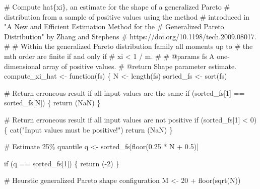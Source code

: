 \documentclass[
  letterpaper,
  DIV=11,
  numbers=noendperiod]{scrartcl}
\newenvironment{Shaded}{\begin{snugshade}}{\end{snugshade}}
\newcommand{\CommentTok}[1]{\textcolor[rgb]{0.37,0.37,0.37}{#1}}
\newcommand{\ConstantTok}[1]{\textcolor[rgb]{0.56,0.35,0.01}{#1}}
\newcommand{\ControlFlowTok}[1]{\textcolor[rgb]{0.00,0.23,0.31}{#1}}
\newcommand{\DecValTok}[1]{\textcolor[rgb]{0.68,0.00,0.00}{#1}}
\newcommand{\FloatTok}[1]{\textcolor[rgb]{0.68,0.00,0.00}{#1}}
\newcommand{\FunctionTok}[1]{\textcolor[rgb]{0.28,0.35,0.67}{#1}}
\newcommand{\NormalTok}[1]{\textcolor[rgb]{0.00,0.23,0.31}{#1}}
\newcommand{\OtherTok}[1]{\textcolor[rgb]{0.00,0.23,0.31}{#1}}
\newcommand{\SpecialCharTok}[1]{\textcolor[rgb]{0.37,0.37,0.37}{#1}}
\newcommand{\StringTok}[1]{\textcolor[rgb]{0.13,0.47,0.30}{#1}}
\begin{document}
\begin{Shaded}
\begin{Highlighting}[]
\CommentTok{\# Compute hat\{xi\}, an estimate for the shape of a generalized Pareto }
\CommentTok{\# distribution from a sample of positive values using the method }
\CommentTok{\# introduced in "A New and Efficient Estimation Method for the }
\CommentTok{\# Generalized Pareto Distribution" by Zhang and Stephens }
\CommentTok{\# https://doi.org/10.1198/tech.2009.08017.}
\CommentTok{\# }
\CommentTok{\# Within the generalized Pareto distribution family all moments up to }
\CommentTok{\# the mth order are finite if and only if }
\CommentTok{\#  xi \textless{} 1 / m.}
\CommentTok{\#}
\CommentTok{\# @params fs A one{-}dimensional array of positive values.}
\CommentTok{\# @return Shape parameter estimate.}
\NormalTok{compute\_xi\_hat }\OtherTok{\textless{}{-}} \ControlFlowTok{function}\NormalTok{(fs) \{}
\NormalTok{  N }\OtherTok{\textless{}{-}} \FunctionTok{length}\NormalTok{(fs)}
\NormalTok{  sorted\_fs }\OtherTok{\textless{}{-}} \FunctionTok{sort}\NormalTok{(fs)}

  \CommentTok{\# Return erroneous result if all input values are the same }
  \ControlFlowTok{if}\NormalTok{ (sorted\_fs[}\DecValTok{1}\NormalTok{] }\SpecialCharTok{==}\NormalTok{ sorted\_fs[N]) \{}
    \FunctionTok{return}\NormalTok{ (}\ConstantTok{NaN}\NormalTok{)}
\NormalTok{  \}}

  \CommentTok{\# Return erroneous result if all input values are not positive}
  \ControlFlowTok{if}\NormalTok{ (sorted\_fs[}\DecValTok{1}\NormalTok{] }\SpecialCharTok{\textless{}} \DecValTok{0}\NormalTok{) \{}
    \FunctionTok{cat}\NormalTok{(}\StringTok{"Input values must be positive!"}\NormalTok{)}
    \FunctionTok{return}\NormalTok{ (}\ConstantTok{NaN}\NormalTok{)}
\NormalTok{  \}}

  \CommentTok{\# Estimate 25\% quantile}
\NormalTok{  q }\OtherTok{\textless{}{-}}\NormalTok{ sorted\_fs[}\FunctionTok{floor}\NormalTok{(}\FloatTok{0.25} \SpecialCharTok{*}\NormalTok{ N }\SpecialCharTok{+} \FloatTok{0.5}\NormalTok{)]}

  \ControlFlowTok{if}\NormalTok{ (q }\SpecialCharTok{==}\NormalTok{ sorted\_fs[}\DecValTok{1}\NormalTok{]) \{}
    \FunctionTok{return}\NormalTok{ (}\SpecialCharTok{{-}}\DecValTok{2}\NormalTok{)}
\NormalTok{  \}}

  \CommentTok{\# Heurstic generalized Pareto shape configuration}
\NormalTok{  M }\OtherTok{\textless{}{-}} \DecValTok{20} \SpecialCharTok{+} \FunctionTok{floor}\NormalTok{(}\FunctionTok{sqrt}\NormalTok{(N))}


\end{Highlighting}
\end{Shaded}
\end{document}
